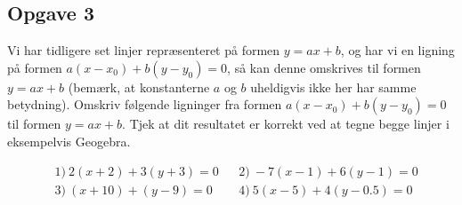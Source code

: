 \subsection*{Opgave 3}
Vi har tidligere set linjer repræsenteret på formen $y = ax+b$, og har vi en ligning på formen $a(x-x_0) + b(y-y_0) = 0$, så kan denne omskrives til formen\\ $y = ax+b$ (bemærk, at konstanterne $a$ og $b$ uheldigvis ikke her har samme betydning). Omskriv følgende ligninger fra formen $a(x-x_0) + b(y-y_0) = 0$ til formen $y=ax+b$. Tjek at dit resultatet er korrekt ved at tegne begge linjer i eksempelvis Geogebra. 

\begin{align*}
&1) \ 2(x+2) + 3(y+3) = 0 &&2) \ -7(x-1) + 6(y-1) = 0\\
&3) \ (x+10) + (y-9) = 0 &&4) \ 5(x-5) + 4(y-0.5) = 0\\
\end{align*}

